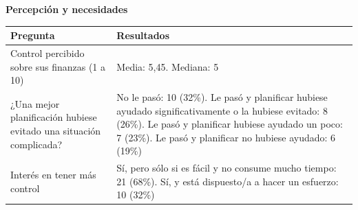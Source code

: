 \textbf{Percepción y necesidades}

{\def\LTcaptype{none} %
\begin{longtable}[]{@{}
  >{\raggedright\arraybackslash}p{}
  >{\raggedright\arraybackslash}p{}@{}}
\toprule\noalign{}
\begin{minipage}[b]{\linewidth}\raggedright
Pregunta
\end{minipage} & \begin{minipage}[b]{\linewidth}\raggedright
Resultados
\end{minipage} \\
\midrule\noalign{}
\endhead
\bottomrule\noalign{}
\endlastfoot
Control percibido sobre sus finanzas (1 a 10) & Media: 5,45. Mediana:
5 \\
¿Una mejor planificación hubiese evitado una situación complicada? & No
le pasó: 10 (32\%). Le pasó y planificar hubiese ayudado
significativamente o la hubiese evitado: 8 (26\%). Le pasó y planificar
hubiese ayudado un poco: 7 (23\%). Le pasó y planificar no hubiese
ayudado: 6 (19\%) \\
Interés en tener más control & Sí, pero sólo si es fácil y no consume
mucho tiempo: 21 (68\%). Sí, y está dispuesto/a a hacer un esfuerzo: 10
(32\%) \\
\end{longtable}
}

